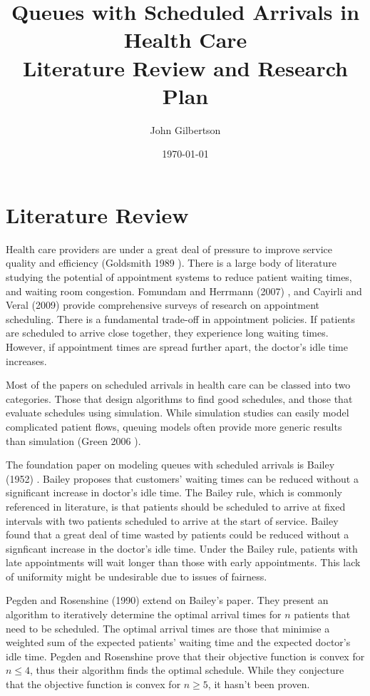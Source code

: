 \documentclass{article}
\title{Queues with Scheduled Arrivals in Health Care \\ Literature Review and Research Plan}
\author{John Gilbertson}
\date{\today}
\begin{document}
\maketitle

\section{Literature Review}

Health care providers are under a great deal of pressure to improve service quality and efficiency (Goldsmith 1989 \cite{Goldsmith}). There is a large body of literature studying the potential of appointment systems to reduce patient waiting times, and waiting room congestion. Fomundam and Herrmann (2007) \cite{Fomundam}, and Cayirli and Veral (2009) \cite{Cayirli} provide comprehensive surveys of research on appointment scheduling. There is a fundamental trade-off in appointment policies. If patients are scheduled to arrive close together, they experience long waiting times. However, if appointment times are spread further apart, the doctor's idle time increases.

Most of the papers on scheduled arrivals in health care can be classed into two categories. Those that design algorithms to find good schedules, and those that evaluate schedules using simulation. While simulation studies can easily model complicated patient flows, queuing models often provide more generic results than simulation (Green 2006 \cite{Green}).

The foundation paper on modeling queues with scheduled arrivals is Bailey (1952) \cite{Bailey}. Bailey proposes that customers' waiting times can be reduced without a significant increase in doctor's idle time. The Bailey rule, which is commonly referenced in literature, is that patients should be scheduled to arrive at fixed intervals with two patients scheduled to arrive at the start of service. Bailey found that a great deal of time wasted by patients could be reduced without a signficant increase in the doctor's idle time. Under the Bailey rule, patients with late appointments will wait longer than those with early appointments. This lack of uniformity might be undesirable due to issues of fairness. 

Pegden and Rosenshine (1990) \cite{Pegden} extend on Bailey's paper. They present an algorithm to iteratively determine the optimal arrival times for $n$ patients that need to be scheduled. The optimal arrival times are those that minimise a weighted sum of the expected patients' waiting time and the expected doctor's idle time. Pegden and Rosenshine prove that their objective function is convex for $n \leq 4$, thus their algorithm finds the optimal schedule. While they conjecture that the objective function is convex for $n \geq 5$, it hasn't been proven.
\end{document}
